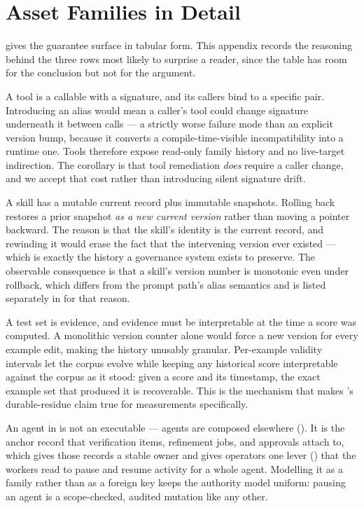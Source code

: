 \section{Asset Families in Detail}
\label{app:families}

 gives the guarantee surface in tabular form. This appendix
records the reasoning behind the three rows most likely to surprise a reader, since
the table has room for the conclusion but not for the argument.

 A tool is a callable with a signature, and its
callers bind to a specific  pair. Introducing an alias would
mean a caller's tool could change signature underneath it between calls --- a
strictly worse failure mode than an explicit version bump, because it converts a
compile-time-visible incompatibility into a runtime one. Tools therefore expose
read-only family history and no live-target indirection. The corollary is that tool
remediation \emph{does} require a caller change, and we accept that cost rather than
introducing silent signature drift.

 A skill has a mutable current
record plus immutable snapshots. Rolling back restores a prior snapshot \emph{as a
new current version} rather than moving a pointer backward. The reason is that the
skill's identity is the current record, and rewinding it would erase the fact that
the intervening version ever existed --- which is exactly the history a governance
system exists to preserve. The observable consequence is that a skill's version
number is monotonic even under rollback, which differs from the prompt path's alias
semantics and is listed separately in  for that reason.

 A
test set is evidence, and evidence must be interpretable at the time a score was
computed. A monolithic version counter alone would force a new version for every
example edit, making the history unusably granular. Per-example validity intervals
let the corpus evolve while keeping any historical score interpretable against the
corpus as it stood: given a score and its timestamp, the exact example set that
produced it is recoverable. This is the mechanism that makes 's
durable-residue claim true for measurements specifically.

 An agent in \sys is not an executable ---
agents are composed elsewhere (). It is the anchor record
that verification items, refinement jobs, and approvals attach to, which gives those
records a stable owner and gives operators one lever () that the
workers read to pause and resume activity for a whole agent. Modelling it as a
family rather than as a foreign key keeps the authority model uniform: pausing an
agent is a scope-checked, audited mutation like any other.
